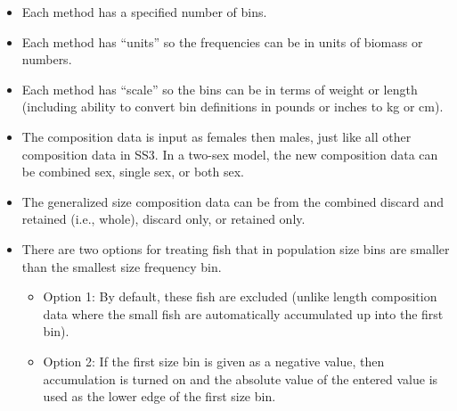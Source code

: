 \begin{itemize}
	\item Each method has a specified number of bins.
	\item Each method has ``units'' so the frequencies can be in units of biomass or numbers.
	\item Each method has ``scale'' so the bins can be in terms of weight or length (including ability to convert bin definitions in pounds or inches to kg or cm). 
	\item The composition data is input as females then males, just like all other composition data in SS3. In a two-sex model, the new composition data can be combined sex, single sex, or both sex.
	\item The generalized size composition data can be from the combined discard and retained (i.e., whole), discard only, or retained only.
	\item There are two options for treating fish that in population size bins are smaller than the smallest size frequency bin.
	\begin{itemize}
		\item Option 1: By default, these fish are excluded (unlike length composition data where the small fish are automatically accumulated up into the first bin).
		\item Option 2: If the first size bin is given as a negative value, then accumulation is turned on and the absolute value of the entered value is used as the lower edge of the first size bin.
	\end{itemize}
\end{itemize}

